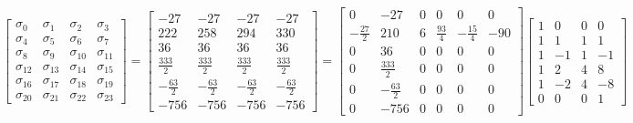 \documentclass{article}%
\begin{document}
\[%
\left[\begin{matrix}\sigma_{0} & \sigma_{1} & \sigma_{2} & \sigma_{3}\\\sigma_{4} & \sigma_{5} & \sigma_{6} & \sigma_{7}\\\sigma_{8} & \sigma_{9} & \sigma_{10} & \sigma_{11}\\\sigma_{12} & \sigma_{13} & \sigma_{14} & \sigma_{15}\\\sigma_{16} & \sigma_{17} & \sigma_{18} & \sigma_{19}\\\sigma_{20} & \sigma_{21} & \sigma_{22} & \sigma_{23}\end{matrix}\right] = \left[\begin{matrix}-27 & -27 & -27 & -27\\222 & 258 & 294 & 330\\36 & 36 & 36 & 36\\\frac{333}{2} & \frac{333}{2} & \frac{333}{2} & \frac{333}{2}\\- \frac{63}{2} & - \frac{63}{2} & - \frac{63}{2} & - \frac{63}{2}\\-756 & -756 & -756 & -756\end{matrix}\right] = \left[\begin{matrix}0 & -27 & 0 & 0 & 0 & 0\\- \frac{27}{2} & 210 & 6 & \frac{93}{4} & - \frac{15}{4} & -90\\0 & 36 & 0 & 0 & 0 & 0\\0 & \frac{333}{2} & 0 & 0 & 0 & 0\\0 & - \frac{63}{2} & 0 & 0 & 0 & 0\\0 & -756 & 0 & 0 & 0 & 0\end{matrix}\right] \left[\begin{matrix}1 & 0 & 0 & 0\\1 & 1 & 1 & 1\\1 & -1 & 1 & -1\\1 & 2 & 4 & 8\\1 & -2 & 4 & -8\\0 & 0 & 0 & 1\end{matrix}\right]%
\]%
\end{document}
